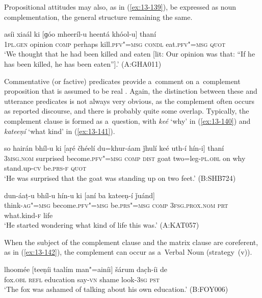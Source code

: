 Propositional attitudes may also, as in (\ref{ex:13-139}), be expressed as noun complementation, the general structure remaining the same.

\begin{exe}
\ex
\label{ex:13-139}
\gll asíi xiaál ki [ɡóo mheeríl-u heentá  khóol-u] thaní \\
\textsc{1pl}.\textsc{gen}  opinion \textsc{comp} perhaps kill.\textsc{pfv"=msg}  \textsc{condl} eat.\textsc{pfv"=msg} \textsc{quot} \\
\glt `We thought that he had been killed and eaten [lit: Our opinion was that: ``If he has been killed, he has been eaten''].' (A:GHA011) 
\end{exe}

 Commentative (or factive) predicates provide a~comment on a~complement proposition that is assumed to be real \citep[127--129]{noonan2007}. Again, the distinction between these and utterance predicates is not always very obvious, as the complement often occurs as reported discourse, and there is probably quite some overlap. Typically, the complement clause is formed as a~question, with \textit{keé} `why' in (\ref{ex:13-140}) and \textit{kateeṇí} `what kind' in (\ref{ex:13-141}).

\begin{exe}
\ex
\label{ex:13-140}
\gll so hairán bhíl-u ki [aṛé čhéelí  du=khur-áam ǰhulí keé uth-í hín-i] thaní \\
\textsc{3msg.nom}  surprised become.\textsc{pfv"=msg} \textsc{comp} \textsc{dist} goat  two=leg-\textsc{pl.obl} on why stand.up-\textsc{cv} be.\textsc{prs-f} \textsc{quot} \\
\glt `He was surprised that the goat was standing up on two feet.' (B:SHB724)

\ex
\label{ex:13-141}
\gll dun-áaṭ-u bhíl-u hín-u ki  [aní ba kateeṇ-í ǰuánd] \\
think-\textsc{ag"=msg} become.\textsc{pfv"=msg} be.\textsc{prs"=msg} \textsc{comp}  \textsc{3fsg.prox.nom} \textsc{prt} what.kind-\textsc{f} life  \\
\glt `He started wondering what kind of life this was.' (A:KAT057) 
\end{exe}

When the subject of the complement clause and the matrix clause are coreferent, as in (\ref{ex:13-142}), the complement can occur as a~Verbal Noun (strategy~(v)).

\begin{exe}
\ex
\label{ex:13-142}
\gll lhoomée [teeṇíi taalím man"=ainíi] šárum  dac̣h-íi de \\
fox.\textsc{obl} \textsc{ refl} education say-\textsc{vn} shame look-\textsc{3sg} \textsc{pst} \\
\glt `The fox was ashamed of talking about his own education.' (B:FOY006) 
\end{exe}

